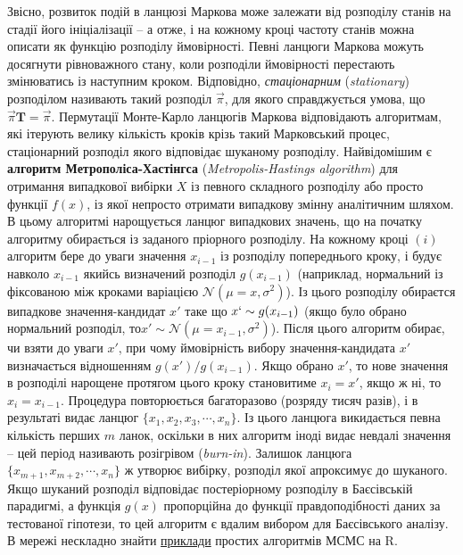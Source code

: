 \documentclass[
  11pt,
]{book}
\begin{document}
Звісно, розвиток подій в ланцюзі Маркова може залежати від розподілу станів на стадії його ініціалізації -- а отже, і на кожному кроці частоту станів можна описати як функцію розподілу ймовірності. Певні ланцюги Маркова можуть досягнути рівноважного стану, коли розподіли ймовірності перестають змінюватись із наступним кроком. Відповідно, \emph{стаціонарним} (\emph{stationary}) розподілом називають такий розподіл \(\vec{\pi}\), для якого справджується умова, що \(\vec{\pi} \mathbf{T} = \vec{\pi}\). Пермутації Монте-Карло ланцюгів Маркова відповідають алгоритмам, які ітерують велику кількість кроків крізь такий Марковський процес, стаціонарний розподіл якого відповідає шуканому розподілу. Найвідомішим є \textbf{алгоритм Метрополіса-Хастінгса} (\emph{Metropolis-Hastings algorithm}) для отримання випадкової вибірки \(X\) із певного складного розподілу або просто функції \(f(x)\), із якої непросто отримати випадкову змінну аналітичним шляхом. В цьому алгоритмі нарощується ланцюг випадкових значень, що на початку алгоритму обирається із заданого пріорного розподілу. На кожному кроці \((i)\) алгоритм бере до уваги значення \(x_{i-1}\) із розподілу попереднього кроку, і будує навколо \(x_{i-1}\) якийсь визначений розподіл \(g(x_{i-1})\) (наприклад, нормальний із фіксованою між кроками варіацією \(\mathcal{N}(\mu = x, \sigma^2)\)). Із цього розподілу обираєтся випадкове значення-кандидат \(x'\) таке що \(x` \sim g(x_{i-1})\) (якщо було обрано нормальний розподіл, то\(x' \sim \mathcal{N}(\mu = x_{i-1}, \sigma^2)\)). Після цього алгоритм обирає, чи взяти до уваги \(x'\), при чому ймовірність вибору значення-кандидата \(x'\) визначається відношенням \(g(x')/g(x_{i-1})\). Якщо обрано \(x'\), то нове значення в розподілі нарощене протягом цього кроку становитиме \(x_i = x'\), якщо ж ні, то \(x_i = x_{i-1}\). Процедура повторюється багаторазово (розряду тисяч разів), і в результаті видає ланцюг \(\{x_1, x_2, x_3, \cdots, x_n\}\). Із цього ланцюга викидається певна кількість перших \(m\) ланок, оскільки в них алгоритм іноді видає невдалі значення -- цей період називають розігрівом (\emph{burn-in}). Залишок ланцюга \(\{x_{m+1}, x_{m+2}, \cdots, x_n\}\) ж утворює вибірку, розподіл якої апроксимує до шуканого. Якщо шуканий розподіл відповідає постеріорному розподілу в Баєсівській парадигмі, а функція \(g(x)\) пропорційна до функції правдоподібності даних за тестованої гіпотези, то цей алгоритм є вдалим вибором для Баєсівського аналізу. В мережі нескладно знайти \href{https://blog.djnavarro.net/posts/2023-04-12_metropolis-hastings/}{приклади} простих алгоритмів МСМС на R.
\end{document}
